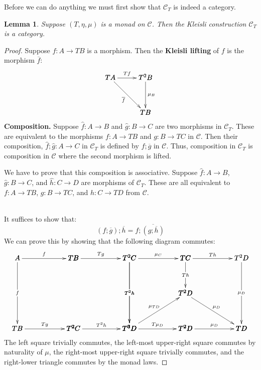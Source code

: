 \documentclass{article}
\let\mto\to
\let\to\relax
\newcommand{\to}{\rightarrow}
\newcommand{\cat}[1]{\mathcal{#1}}
\newtheorem{lemma}[theorem]{Lemma}
\begin{document}
Before we can do anything we must first show that $\cat{C}_T$ is
indeed a category.
\begin{lemma}
  \label{lemma:Kleisli_is_a_category}
  Suppose $(T,\eta,\mu)$ is a monad on $\cat{C}$.  Then the Kleisli
  construction $\cat{C}_T$ is a category.
\end{lemma}
\begin{proof}
  Suppose $f : A \mto TB$ is a morphism.  Then the \textbf{Kleisli
    lifting} of $f$ is the morphism $\overline{f}$:
  \[ 
  \bfig
  \qtriangle[
    TA`
    T^2B`
    TB;
    Tf`
    \overline{f}`
    \mu_B]
  \efig
  \]
  \noindent
  \textbf{Composition.} Suppose $\hat{f} : A \mto B$ and $\hat{g} : B
  \mto C$ are two morphisms in $\cat{C}_T$.  These are equivalent to
  the morphisms $f : A \mto TB$ and $g : B \mto TC$ in $\cat{C}$.
  Then their composition, $\hat{f};\hat{g} : A \mto C$ in $\cat{C}_T$
  is defined by $f;\overline{g}$ in $\cat{C}$.  Thus, composition in
  $\cat{C}_T$ is composition in $\cat{C}$ where the second morphism is
  lifted.

  We have to prove that this composition is associative.  Suppose
  $\hat{f} : A \mto B$, $\hat{g} : B \mto C$, and $\hat{h} : C \mto D$
  are morphisms of $\cat{C}_T$.  These are all equivalent to $f : A
  \mto TB$, $g : B \mto TC$, and $h : C \mto TD$ from $\cat{C}$.

  \ \\
  \noindent
  It suffices to show that:
  \[
  (f;\overline{g});\overline{h} = f;\overline{(g;\overline{h})}
  \]  
  We can prove this by showing that the following diagram commutes:
  \[
  \bfig
  \square|amma|/->`->``->/<800,1000>[
    A`
    TB`
    TB`
    T^2C;
    f`
    f``
    Tg]
  \square(800,0)|amma|/->``->`->/<800,1000>[
    TB`
    T^2C`
    T^2C`
    T^3D;
    Tg``
    T^2h`
    T^2h]
  \square(1600,0)|amma|/->`->``->/<800,1000>[
    T^2C`
    TC`
    T^3D`
    T^2D;
    \mu_C`
    T^2h``
    T\mu_D]
  \square(2400,0)|amma|/->``->`->/<800,1000>[
    TC`
    T^2D`
    T^2D`
    TD;
    Th``
    \mu_D`
    \mu_D]
  \Atriangle(1600,0)/<-`->`/<800,500>[
    T^2D`
    T^3D`
    TD;
    \mu_{TD}`
    \mu_D`]
  \morphism(2400,1000)|m|<0,-500>[
    TC`
    T^2D;
    Th]
  \efig
  \]
  The left square trivially commutes, the left-most upper-right square
  commutes by naturality of $\mu$, the right-most upper-right square
  trivially commutes, and the right-lower triangle commutes by the
  monad laws.


\end{proof}
\end{document}
